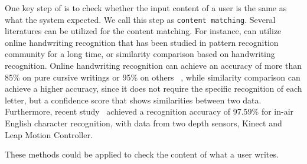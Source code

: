 One key step of \CiT is to check  whether the input content of a user is the same as what the system expected. We call this step as \texttt{content matching}.
Several literatures can be utilized for the content matching. 
For instance, \CiT can utilize online handwriting recognition that has been studied in pattern recognition community for a long time,  or similarity comparison based on handwriting recognition. Online handwriting recognition can achieve an accuracy of more than 85\% on pure cursive writings or 95\% on others ~\cite{Tappert90, LeeV12Cursive,Madhvanath2012,Plamondon2000Review}, while similarity comparison can achieve a higher accuracy, since it does not require the specific recognition of each letter, but a confidence score that shows similarities between two data. Furthermore, recent study~\cite{ICDAR15:OnlineHandwriting} achieved a recognition accuracy of 97.59\% for in-air English character recognition, with data from two depth sensors, Kinect and Leap Motion Controller. { These methods could be applied to check the content of what a user writes.

}



